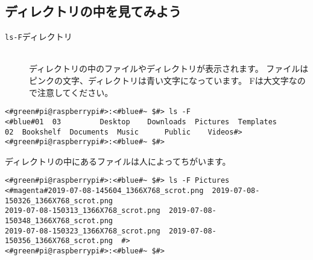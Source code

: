\subsection{ディレクトリの中を見てみよう}
\begin{description}
\item[\texttt{ls}\textvisiblespace \texttt{-F}\textvisiblespace ディレクトリ]\mbox{}\\
ディレクトリの中のファイルやディレクトリが表示されます。
ファイルはピンクの文字、ディレクトリは青い文字になっています。
Fは大文字なので注意してください。
\end{description}

\begin{minipage}{\linewidth}
\begin{lstlisting}[caption=ls -F コマンドの例。ファイルやディレクトリが表示されます,label=lsFtest]
<#green#pi@raspberrypi#>:<#blue#~ $#> ls -F
<#blue#01  03         Desktop    Downloads  Pictures  Templates
02  Bookshelf  Documents  Music      Public    Videos#>
<#green#pi@raspberrypi#>:<#blue#~ $#>
\end{lstlisting}
\end{minipage}


ディレクトリの中にあるファイルは人によってちがいます。
\begin{lstlisting}[caption=ls -F Pictures/コマンドの例,label=lsFPicttest]
<#green#pi@raspberrypi#>:<#blue#~ $#> ls -F Pictures
<#magenta#2019-07-08-145604_1366X768_scrot.png  2019-07-08-150326_1366X768_scrot.png  
2019-07-08-150313_1366X768_scrot.png  2019-07-08-150348_1366X768_scrot.png  
2019-07-08-150323_1366X768_scrot.png  2019-07-08-150356_1366X768_scrot.png  #>
<#green#pi@raspberrypi#>:<#blue#~ $#> 
\end{lstlisting}

\begin{tcolorbox}[title=\useOmetoi]
\begin{enumerate}
\end{enumerate}
\end{tcolorbox}


